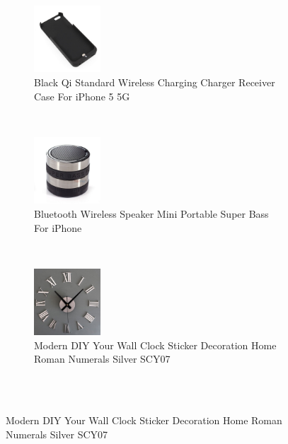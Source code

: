 \documentclass{article} %
\begin{document}
\begin{figure}
        \centering
        \begin{subfigure}[b]{0.3\textwidth}
                \centering
                \includegraphics[width=25mm]{figures/standard-iphone-case.jpg}
                \caption{Black Qi Standard Wireless Charging Charger Receiver Case For iPhone 5 5G}
                \label{fig:standard-iphone-case}
        \end{subfigure}%
              ~ %
        \begin{subfigure}[b]{0.3\textwidth}
                \centering
                \includegraphics[width=25mm]{figures/standard-iphone-speaker.jpg}
                \caption{Bluetooth Wireless Speaker Mini Portable Super Bass For iPhone}
                \label{fig:standard-speaker}
        \end{subfigure}%
              ~ %
        \begin{subfigure}[b]{0.3\textwidth}
                \centering
                \includegraphics[width=25mm]{figures/standard-clock.jpg}
                \caption{Modern DIY Your Wall Clock Sticker Decoration Home Roman Numerals Silver SCY07}
                \label{fig:standard-speaker}
        \end{subfigure}\\
        ~ %

\end{figure}
\end{document}
